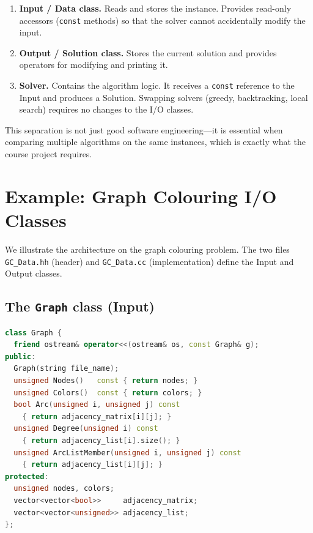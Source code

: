 \begin{enumerate}
  \item \textbf{Input / Data class.}
    Reads and stores the instance.  Provides read-only accessors
    (\texttt{const} methods) so that the solver cannot
    accidentally modify the input.

  \item \textbf{Output / Solution class.}
    Stores the current solution and provides operators for
    modifying and printing it.

  \item \textbf{Solver.}
    Contains the algorithm logic.  It receives a \texttt{const}
    reference to the Input and produces a Solution.
    Swapping solvers (greedy, backtracking, local search) requires
    no changes to the I/O classes.
\end{enumerate}

This separation is not just good software engineering---it is
essential when comparing multiple algorithms on the same
instances, which is exactly what the course project requires.


\section{Example: Graph Colouring I/O Classes}
\label{sec:gc-data}

We illustrate the architecture on the graph colouring problem.
The two files \texttt{GC\_Data.hh} (header) and
\texttt{GC\_Data.cc} (implementation) define the Input and Output
classes.

\subsection{The \texttt{Graph} class (Input)}
\label{ssec:graph-class}

\begin{lstlisting}[language=C++,
  caption={\texttt{GC\_Data.hh} --- the \texttt{Graph} class
           (input data).},
  label={lst:gc-data-hh-graph}]
class Graph {
  friend ostream& operator<<(ostream& os, const Graph& g);
public:
  Graph(string file_name);
  unsigned Nodes()   const { return nodes; }
  unsigned Colors()  const { return colors; }
  bool Arc(unsigned i, unsigned j) const
    { return adjacency_matrix[i][j]; }
  unsigned Degree(unsigned i) const
    { return adjacency_list[i].size(); }
  unsigned ArcListMember(unsigned i, unsigned j) const
    { return adjacency_list[i][j]; }
protected:
  unsigned nodes, colors;
  vector<vector<bool>>     adjacency_matrix;
  vector<vector<unsigned>> adjacency_list;
};
\end{lstlisting}

